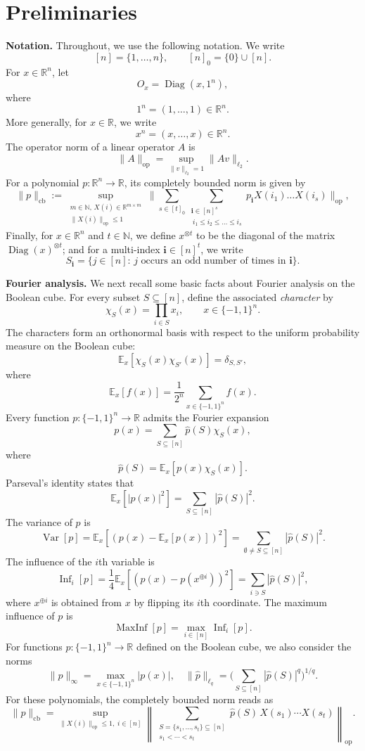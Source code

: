 \documentclass[11pt]{article}
\DeclareMathOperator{\cb}{cb}
\DeclareMathOperator{\op}{op}
\newcommand{\norm}[1]{\|#1\|}
\newcommand{\R}{\mathbb{R}} %
\newcommand{\N}{\mathbb{N}} %
\newcommand{\1}{\mathbf{1}}
\newcommand{\ind}[1]{\mathbf{#1}}
\theoremstyle{plain}
\theoremstyle{definition}
\theoremstyle{remark}
\begin{document}
\section{Preliminaries}



\textbf{Notation. } Throughout, we use the following notation. We write
\[
[n]=\{1,\ldots,n\},\qquad
[n]_0=\{0\}\cup[n].
\]
For $x\in\mathbb{R}^n$, let
\[
O_x=\operatorname{Diag}(x,1^n),
\]
where
\[
1^n=(1,\ldots,1)\in\mathbb{R}^n.
\]
More generally, for $x\in\mathbb{R}$, we write
\[
x^n=(x,\ldots,x)\in\mathbb{R}^n.
\]
The operator norm of a linear operator $A$ is
\[
\|A\|_{\op}
=
\sup_{\|v\|_{\ell_2}=1}\|Av\|_{\ell_2}.
\]
For a polynomial $p:\R^n\to \R$, its completely bounded norm is given by 
\begin{equation}\label{eq:cbnorm2}
    \norm{p}_{\cb}:=\sup_{\substack{m\in\N,\, X(i)\in\R^{m\times m}\\ \norm{X(i)}_{\op}\leq 1}} \norm{\sum_{s\in [t]_0}\sum_{\substack{\ind i\in [n]^s\\\ i_1\leq i_2\leq \dots \leq i_s}}p_{\ind i} X(i_1)\dots X(i_s)}_{\op},
\end{equation}
Finally, for $x\in\mathbb{R}^n$ and $t\in\mathbb{N}$, we define $x^{\otimes t}$ to be the diagonal of the matrix $\operatorname{Diag}(x)^{\otimes t}$; and for a multi-index $\ind i\in[n]^t$, we write
\[
S_{\ind i}
=
\{j\in[n]:\,j\text{ occurs an odd number of times in }\ind i\}.
\]

\textbf{Fourier analysis.} We next recall some basic facts about Fourier analysis on the Boolean cube. For every subset $S\subseteq[n]$, define the associated \emph{character} by
\[
\chi_S(x)=\prod_{i\in S}x_i,\qquad x\in\{-1,1\}^n.
\]
The characters form an orthonormal basis with respect to the uniform probability measure on the Boolean cube:
\[
\mathbb{E}_x[\chi_S(x)\chi_{S'}(x)]
=
\delta_{S,S'},
\]
where
\[
\mathbb{E}_x[f(x)]
=
\frac{1}{2^n}
\sum_{x\in\{-1,1\}^n}f(x).
\]
Every function $p:\{-1,1\}^n\to\mathbb{R}$ admits the Fourier expansion
\[
p(x)
=
\sum_{S\subseteq[n]}
\widehat p(S)\chi_S(x),
\]
where
\[
\widehat p(S)
=
\mathbb{E}_x[p(x)\chi_S(x)].
\]
Parseval's identity states that 
\[
\mathbb E_x[|p(x)|^2]=\sum_{S\subseteq [n]}|\widehat p(S)|^2.
\]
The variance of $p$ is
\[
\operatorname{Var}[p]
=
\mathbb{E}_x\!\left[(p(x)-\mathbb{E}_x[p(x)])^2\right]
=
\sum_{\emptyset\neq S\subseteq[n]}|\widehat p(S)|^2.
\]
The influence of the $i$th variable is
\[
\operatorname{Inf}_i[p]
=
\frac14\mathbb{E}_x\!\left[(p(x)-p(x^{\oplus i}))^2\right]
=
\sum_{i\ni S}|\widehat p(S)|^2,
\]
where $x^{\oplus i}$ is obtained from $x$ by flipping its $i$th coordinate. The maximum influence of $p$ is
\[
\operatorname{MaxInf}[p]
=
\max_{i\in[n]}\operatorname{Inf}_i[p].
\]
For functions $p:\{-1,1\}^n\to\R$ defined on the Boolean cube, we also consider the norms
\[
\|p\|_{\infty}
=
\max_{x\in\{-1,1\}^n}|p(x)|, \quad  \norm{\widehat p}_{\ell_q}=\Big(\sum_{S\subseteq [n]}|\widehat p(S)|^q\Big)^{1/q}.
\]
For these polynomials, the completely bounded norm reads as \[
\|p\|_{\cb}
=
\sup_{\|X(i)\|_{\op}\le1,\;i\in[n]}
\left\|
\sum_{\substack{S=\{s_1,\ldots,s_t\}\subseteq[n]\\
s_1<\cdots<s_t}}
\widehat p(S)\,
X(s_1)\cdots X(s_t)
\right\|_{\op}.
\]
\end{document}
